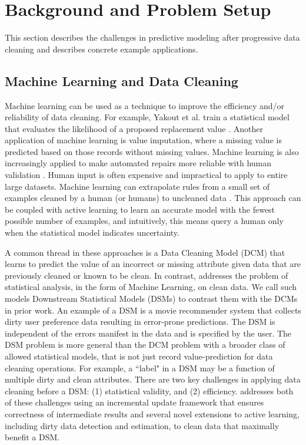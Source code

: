 \section{Background and Problem Setup}\label{background}
This section describes the challenges in predictive modeling after progressive data 
cleaning and describes concrete example applications.

\subsection{Machine Learning and Data Cleaning}\label{alrw}
Machine learning can be used as a technique to improve the efficiency and/or reliability of data cleaning\cite{yakout2013don,gokhale2014corleone}.
For example, Yakout et al. train a statistical model that evaluates the likelihood of a proposed replacement value \cite{yakout2013don}.
Another application of machine learning is value imputation, where a missing value is predicted based on those records without missing values.
Machine learning is also increasingly applied to make automated repairs more reliable with human validation \cite{DBLP:journals/pvldb/YakoutENOI11}.
Human input is often expensive and impractical to apply to entire large datasets.
Machine learning can extrapolate rules from a small set of examples cleaned by a human (or humans) to uncleaned data \cite{gokhale2014corleone, DBLP:journals/pvldb/YakoutENOI11}.
This approach can be coupled with active learning \cite{DBLP:journals/pvldb/MozafariSFJM14} to learn an accurate model with the fewest possible number of examples, and intuitively, this means
query a human only when the statistical model indicates uncertainty.

A common thread in these approaches is a Data Cleaning Model (DCM) that learns to predict the value of an incorrect or missing attribute given data that are previously cleaned or known to be clean.
In contrast, \sys addresses the problem of statistical analysis, in the form of Machine Learning, on clean data.
We call such models Downstream Statistical Models (DSMs) to contrast them with the DCMs in prior work.
An example of a DSM is a movie recommender system that collects dirty user preference data resulting in error-prone predictions.
The DSM is independent of the errors manifest in the data and is specified by the user.
The DSM problem is more general than the DCM problem with a broader class of allowed statistical models, that is not just record value-prediction for data cleaning operations.
For example, a ``label" in a DSM may be a function of multiple dirty and clean attributes.
There are two key challenges in applying data cleaning before a DSM: (1) statistical validity, and (2) efficiency. 
\sys addresses both of these challenges using an incremental update framework that ensures correctness of intermediate results and several novel extensions to active learning, including dirty data detection and estimation, to clean data that maximally benefit a DSM.

